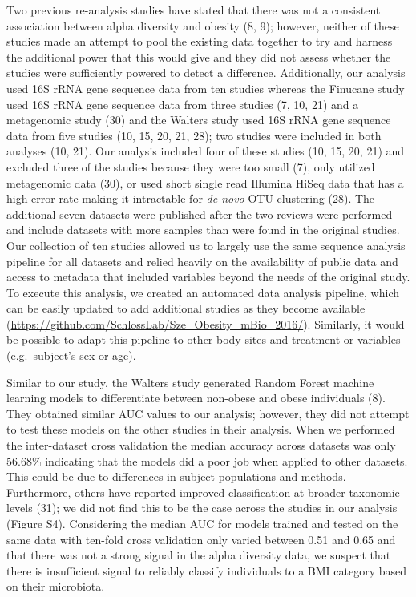 \documentclass[12pt,]{article}
\begin{document}
Two previous re-analysis studies have stated that there was not a
consistent association between alpha diversity and obesity (8, 9);
however, neither of these studies made an attempt to pool the existing
data together to try and harness the additional power that this would
give and they did not assess whether the studies were sufficiently
powered to detect a difference. Additionally, our analysis used 16S rRNA
gene sequence data from ten studies whereas the Finucane study used 16S
rRNA gene sequence data from three studies (7, 10, 21) and a metagenomic
study (30) and the Walters study used 16S rRNA gene sequence data from
five studies (10, 15, 20, 21, 28); two studies were included in both
analyses (10, 21). Our analysis included four of these studies (10, 15,
20, 21) and excluded three of the studies because they were too small
(7), only utilized metagenomic data (30), or used short single read
Illumina HiSeq data that has a high error rate making it intractable for
\emph{de novo} OTU clustering (28). The additional seven datasets were
published after the two reviews were performed and include datasets with
more samples than were found in the original studies. Our collection of
ten studies allowed us to largely use the same sequence analysis
pipeline for all datasets and relied heavily on the availability of
public data and access to metadata that included variables beyond the
needs of the original study. To execute this analysis, we created an
automated data analysis pipeline, which can be easily updated to add
additional studies as they become available
(\url{https://github.com/SchlossLab/Sze_Obesity_mBio_2016/}). Similarly,
it would be possible to adapt this pipeline to other body sites and
treatment or variables (e.g.~subject's sex or age).

Similar to our study, the Walters study generated Random Forest machine
learning models to differentiate between non-obese and obese individuals
(8). They obtained similar AUC values to our analysis; however, they did
not attempt to test these models on the other studies in their analysis.
When we performed the inter-dataset cross validation the median accuracy
across datasets was only 56.68\% indicating that the models did a poor
job when applied to other datasets. This could be due to differences in
subject populations and methods. Furthermore, others have reported
improved classification at broader taxonomic levels (31); we did not
find this to be the case across the studies in our analysis (Figure S4).
Considering the median AUC for models trained and tested on the same
data with ten-fold cross validation only varied between 0.51 and 0.65
and that there was not a strong signal in the alpha diversity data, we
suspect that there is insufficient signal to reliably classify
individuals to a BMI category based on their microbiota.
\end{document}
